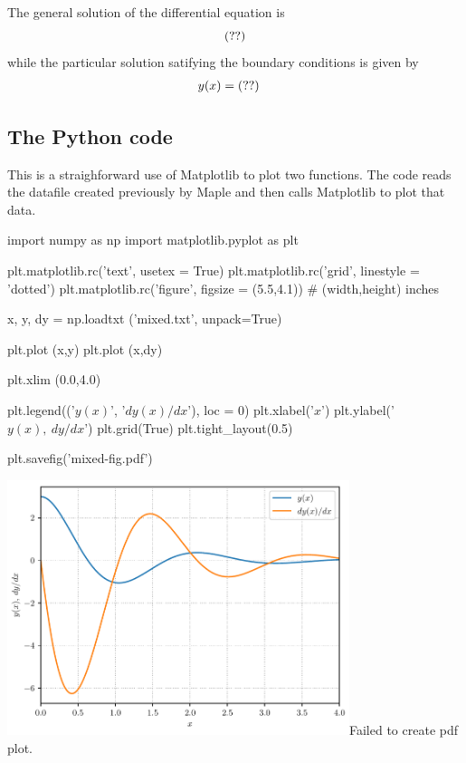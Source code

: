 \documentclass[12pt]{article}
\begin{document}
The general solution of the differential equation is
\begin{equation*}
   \mpl{ans.102}
\end{equation*}
while the particular solution satifying the boundary conditions is given by
\vspace{5pt}
\begin{align*}
    y(x) &= \mpl{ans.104}
\end{align*}

\subsection*{The Python code}

This is a straighforward use of Matplotlib to plot two functions. The code reads the datafile created previously by Maple and then calls Matplotlib to plot that data.

\begin{python}
   import numpy as np
   import matplotlib.pyplot as plt

   plt.matplotlib.rc('text', usetex = True)
   plt.matplotlib.rc('grid', linestyle = 'dotted')
   plt.matplotlib.rc('figure', figsize = (5.5,4.1)) # (width,height) inches

   x, y, dy = np.loadtxt ('mixed.txt', unpack=True)

   plt.plot (x,y)
   plt.plot (x,dy)

   plt.xlim (0.0,4.0)

   plt.legend(('$y(x)$', '$dy(x)/dx$'), loc = 0)
   plt.xlabel('$x$')
   plt.ylabel('$y(x),\> dy/dx$')
   plt.grid(True)
   plt.tight_layout(0.5)

   plt.savefig('mixed-fig.pdf')
\end{python}

\vspace{10pt}

\begin{minipage}{\textwidth}
   \centering
   {\includegraphics[width=0.75\textwidth]{mixed-fig.pdf}}{Failed to create pdf plot.}
\end{minipage}
\end{document}
